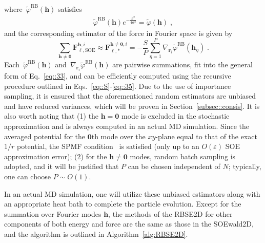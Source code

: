 where~$\widetilde{\varphi}^{\text{RB}}({\bm{h}})$ satisfies
\begin{equation}
	\begin{split}
		\widetilde{\varphi}^{\text{RB}}({\bm{h}}) e^{ - \frac{h^2}{4\alpha^2}} = \widetilde{\varphi}({\bm{h}}) \;,
	\end{split}
\end{equation}
and the corresponding estimator of the force in Fourier space is given by
\begin{equation}
	\sum_{\bm{h}\neq\bm{0}}\bm{F}_{\ell,\text{SOE}}^{\bm{h},i}\approx \bm{F}_{\ell,*}^{\bm{h}\neq\bm{0},i}=-\frac{S}{P} \sum_{\eta=1}^{P}\nabla_{\bm{r}_{i}}\widetilde{\varphi}^{\text{RB}}(\bm{h}_{\eta})\;.
\end{equation}
Each~$\widetilde{\varphi}^{\text{RB}}({\bm{h}})$ and~$\nabla_{\bm{r}_{i}}\widetilde{\varphi}^{\text{RB}}(\bm{h})$ are pairwise summations, fit into the general form of Eq.~\eqref{eq::33}, and can be efficiently computed using the recursive procedure outlined in Eqs.~\eqref{eq::S}-\eqref{eq::35}. 
Due to the use of importance sampling, it is ensured that the aforementioned random estimators are unbiased and have reduced variances, which will be proven in Section~\ref{subsec::consis}.
It is also worth noting that (1) the $\bm h=\bm 0$ mode is excluded in the stochastic approximation and is always computed in an actual MD simulation. Since the averaged potential for the $\bm 0$th mode over the $xy$-plane equal to that of the exact $1/r$ potential, the SPMF condition~\cite{hu2014symmetry} is satisfied (only up to an $O(\varepsilon)$ SOE approximation error); (2) for the  $\bm h\neq \bm 0$ modes, random batch sampling is adopted, and it will be justified that $P$ can be chosen independent of $N$; typically, one can choose $P\sim O(1)$.


In an actual MD simulation, one will utilize these unbiased estimators along with an appropriate heat bath to complete the particle evolution.  
Except for the summation over Fourier modes $\bm{h}$, the methods of the RBSE2D for other components of both energy and force are the same as those in the SOEwald2D, and the algorithm is outlined in Algorithm~\ref{alg:RBSE2D}.

